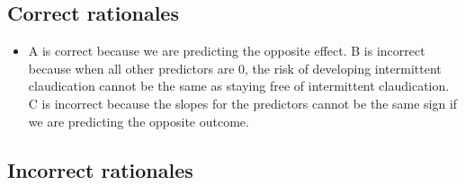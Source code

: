 \documentclass[letterpaper,9pt,twoside,printwatermark=false]{pinp}
\providecommand{\tightlist}{%
  \setlength{\itemsep}{0pt}\setlength{\parskip}{0pt}}
\begin{document}
\subsection{Correct rationales}\label{correct-rationales-8}

\begin{itemize}
\tightlist
\item
  A is correct because we are predicting the opposite effect. B is
  incorrect because when all other predictors are 0, the risk of
  developing intermittent claudication cannot be the same as staying
  free of intermittent claudication. C is incorrect because the slopes
  for the predictors cannot be the same sign if we are predicting the
  opposite outcome.
\end{itemize}

\subsection{Incorrect rationales}\label{incorrect-rationales-8}





\end{document}

